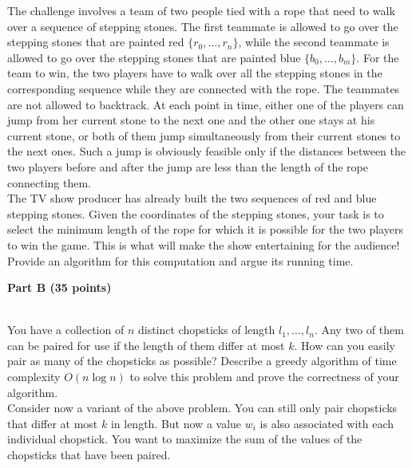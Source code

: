 \documentclass{article}
\begin{document}
\noindent The challenge involves a team of two people tied with a rope
that need to walk over a sequence of stepping stones. The first
teammate is allowed to go over the stepping stones that are painted
red $\{r_0, \ldots, r_n\}$, while the second teammate is allowed to go
over the stepping stones that are painted blue $\{b_0, \ldots,
b_m\}$. For the team to win, the two players have to walk over all the
stepping stones in the corresponding sequence while they are connected
with the rope. The teammates are not allowed to backtrack. At each
point in time, either one of the players can jump from her current
stone to the next one and the other one stays at his current stone, or
both of them jump simultaneously from their current stones to the next
ones. Such a jump is obviously feasible only if the distances between
the two players before and after the jump are less than the length of
the rope connecting them.\\

\noindent The TV show producer has already built the two sequences of
red and blue stepping stones. Given the coordinates of the stepping
stones, your task is to select the minimum length of the rope for
which it is possible for the two players to win the game. This is what
will make the show entertaining for the audience!\\

\noindent Provide an algorithm for this computation and argue its
running time.


\begin{center}
{\bf Part B (35 points)}
\end{center}

\\

 You have a collection of $n$ distinct chopsticks of
length $l_{1},\dots,l_{n}$. Any two of them can be paired for use if
the length of them differ at most $k$. How can you easily pair as many
of the chopsticks as possible? Describe a greedy algorithm of time
complexity $O(n\log n)$ to solve this problem and prove the
correctness of your algorithm.\\

 Consider now a variant of the above problem. You
can still only pair chopsticks that differ at most $k$ in length. But
now a value $w_{i}$ is also associated with each individual
chopstick. You want to maximize the sum of the values of the
chopsticks that have been paired.\\
\end{document}
